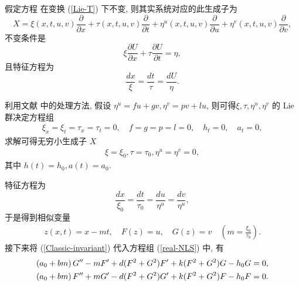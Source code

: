 假定方程  在变换 (\ref{Lie-T}) 下不变, 则其实系统对应的此生成子为
\begin{equation}
X=\xi(x,t,u,v)\frac{\partial}{\partial x}+\tau(x,t,u,v)\frac{\partial}{\partial t}+\eta^u(x,t,u,v)\frac{\partial}{\partial u}+\eta^v(x,t,u,v)\frac{\partial}{\partial v},
\end{equation}
不变条件是
\begin{equation*}
\xi \frac{\partial U}{\partial x}+\tau \frac{\partial U}{\partial t}=\eta,
\end{equation*}
且特征方程为
\begin{equation*}
\frac{d x}{\xi}=\frac{d t}{\tau}=\frac{d U}{\eta}.
\end{equation*}



利用文献 \cite{Bluman2002} 中的处理方法, 假设 $\eta^u=fu+gv,\eta^v=pv+lu$, 则可得$\xi, \tau, \eta^u, \eta^v$ 的 Lie 群决定方程组
\begin{align*}
\xi_x=\xi_t=\tau_x=\tau_t=0,\quad f=g=p=l=0,\quad h_t=0,\quad a_t=0,
\end{align*}
求解可得无穷小生成子 $X$
\begin{align}
\xi=\xi_0,\tau=\tau_0,\eta^u=\eta^v=0,
\end{align}
其中 $h(t)=h_0,a(t)=a_0$.

特征方程为
\begin{equation*}
\frac{dx}{\xi_0}=\frac{dt}{\tau_0}=\frac{du}{\eta^u}=\frac{dv}{\eta^u},
\end{equation*}
于是得到相似变量
\begin{align}\label{Classic-invariant}
z(x,t)=x-mt,\quad F(z)=u,\quad G(z)=v \quad(m=\frac{\xi_0}{\tau_0}).
\end{align}
接下来将 (\ref{Classic-invariant}) 代入方程组 (\ref{real-NLS}) 中, 有
\begin{align}
(a_0+bm)\,G''-m F'+d(F^2+G^2)F'+k(F^2+G^2)G-h_0G=0,\notag\\
(a_0+bm)\,F''+m G'-d(F^2+G^2)G'+k(F^2+G^2)F-h_0F=0.
\end{align}


